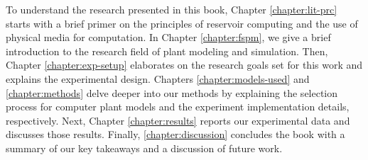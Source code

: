 To understand the research presented in this book, Chapter \ref{chapter:lit-prc} starts with a brief primer on the principles of reservoir computing and the use of physical media for computation. 
In Chapter \ref{chapter:fspm}, we give a brief introduction to the research field of plant modeling and simulation. 
Then, Chapter \ref{chapter:exp-setup} elaborates on the research goals set for this work and explains the experimental design.
Chapters \ref{chapter:models-used} and \ref{chapter:methods} delve deeper into our methods by explaining the selection process for computer plant models and the experiment implementation details, respectively.
Next, Chapter \ref{chapter:results} reports our experimental data and discusses those results. 
Finally, \ref{chapter:discussion} concludes the book with a summary of our key takeaways and a discussion of future work.